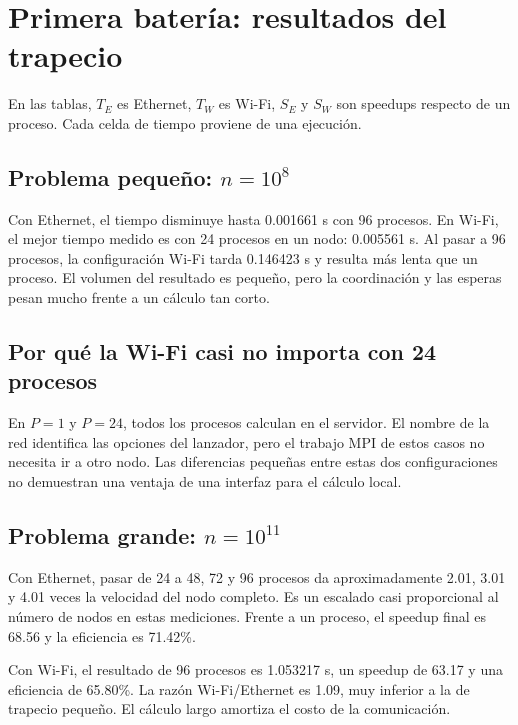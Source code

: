 \clearpage
\section{Primera batería: resultados del trapecio}

En las tablas, $T_E$ es Ethernet, $T_W$ es Wi-Fi, $S_E$ y $S_W$ son speedups respecto de un proceso. Cada celda de tiempo proviene de una ejecución.

\subsection{Problema pequeño: \texorpdfstring{$n=10^8$}{n = 100000000}}

Con Ethernet, el tiempo disminuye hasta 0.001661 s con 96 procesos. En Wi-Fi, el mejor tiempo medido es con 24 procesos en un nodo: 0.005561 s. Al pasar a 96 procesos, la configuración Wi-Fi tarda 0.146423 s y resulta más lenta que un proceso. El volumen del resultado es pequeño, pero la coordinación y las esperas pesan mucho frente a un cálculo tan corto.


\subsection{Por qué la Wi-Fi casi no importa con 24 procesos}
En $P=1$ y $P=24$, todos los procesos calculan en el servidor. El nombre de la red identifica las opciones del lanzador, pero el trabajo MPI de estos casos no necesita ir a otro nodo. Las diferencias pequeñas entre estas dos configuraciones no demuestran una ventaja de una interfaz para el cálculo local.

\clearpage
\subsection{Problema grande: \texorpdfstring{$n=10^{11}$}{n = 100000000000}}


Con Ethernet, pasar de 24 a 48, 72 y 96 procesos da aproximadamente 2.01, 3.01 y 4.01 veces la velocidad del nodo completo. Es un escalado casi proporcional al número de nodos en estas mediciones. Frente a un proceso, el speedup final es 68.56 y la eficiencia es 71.42\%.

Con Wi-Fi, el resultado de 96 procesos es 1.053217 s, un speedup de 63.17 y una eficiencia de 65.80\%. La razón Wi-Fi/Ethernet es 1.09, muy inferior a la de trapecio pequeño. El cálculo largo amortiza el costo de la comunicación.


